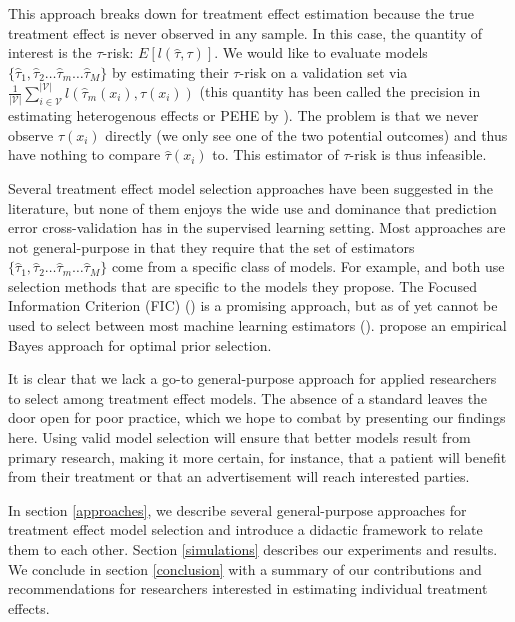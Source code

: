 This approach breaks down for treatment effect estimation because the true treatment effect is never observed in any sample. In this case, the quantity of interest is the $\tau$-risk: $E[l(\hat\tau, \tau)]$. We would like to evaluate models $\{\hat\tau_1, \hat\tau_2 \dots \hat \tau_m \dots \hat \tau_M\}$ by estimating their $\tau$-risk on a validation set via $\frac{1}{|\mathcal{V}|}\sum_{i \in \mathcal{V}}^{|\mathcal{V}|}  l(\hat \tau_m (x_i), \tau(x_i))$ (this quantity has been called the precision in estimating heterogenous effects or PEHE by \citet{Hill2011}). The problem is that we never observe $\tau(x_i)$ directly (we only see one of the two potential outcomes) and thus have nothing to compare $\hat\tau(x_i)$ to. This estimator of $\tau$-risk is thus infeasible.

Several treatment effect model selection approaches have been suggested in the literature, but none of them enjoys the wide use and dominance that prediction error cross-validation has in the supervised learning setting. Most approaches are not general-purpose in that they require that the set of estimators $\{\hat\tau_1, \hat\tau_2 \dots \hat \tau_m \dots \hat \tau_M\}$ come from a specific class of models. For example, \citet{Powers:2017wd} and \citet{Athey2015} both use selection methods that are specific to the models they propose. The Focused Information Criterion (FIC) (\citealp{Claeskens:2003ck}) is a promising approach, but as of yet cannot be used to select between most machine learning estimators (\citealp{Jullum:2012uo}). \citet{Alaa:tj} propose an empirical Bayes approach for optimal prior selection.

It is clear that we lack a go-to general-purpose approach for applied researchers to select among treatment effect models. The absence of a standard leaves the door open for poor practice, which we hope to combat by presenting our findings here. Using valid model selection will ensure that better models result from primary research, making it more certain, for instance, that a patient will benefit from their treatment or that an advertisement will reach interested parties. 

In section \ref{approaches}, we describe several general-purpose approaches for treatment effect model selection and introduce a didactic framework to relate them to each other. Section \ref{simulations} describes our experiments and results. We conclude in section \ref{conclusion} with a summary of our contributions and recommendations for researchers interested in estimating individual treatment effects.

